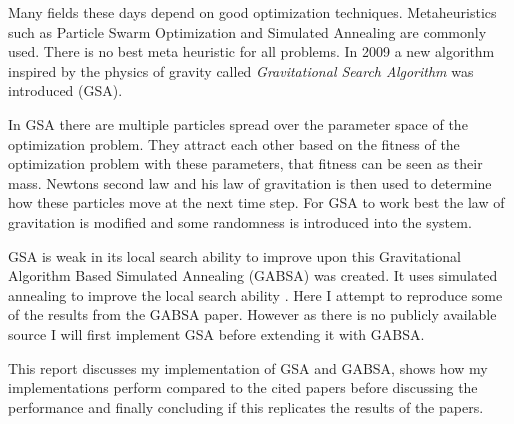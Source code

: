 Many fields these days depend on good optimization techniques. Metaheuristics such as Particle Swarm Optimization and Simulated Annealing are commonly used. There is no best meta heuristic for all problems. In 2009 a new algorithm inspired by the physics of gravity called \textit{Gravitational Search Algorithm} was introduced (GSA)\cite{GSA}. 

In GSA there are multiple particles spread over the parameter space of the optimization problem. They attract each other based on the fitness of the optimization problem with these parameters, that fitness can be seen as their mass. Newtons second law and his law of gravitation is then used to determine how these particles move at the next time step. For GSA to work best the law of gravitation is modified and some randomness is introduced into the system.

GSA is weak in its local search ability to improve upon this Gravitational Algorithm Based Simulated Annealing (GABSA) was created. It uses simulated annealing to improve the local search ability \cite{GABSA}. Here I attempt to reproduce some of the results from the GABSA paper. However as there is no publicly available source I will first implement GSA before extending it with GABSA. 

This report discusses my implementation of GSA and GABSA, shows how my implementations perform compared to the cited papers before discussing the performance and finally concluding if this replicates the results of the papers.
